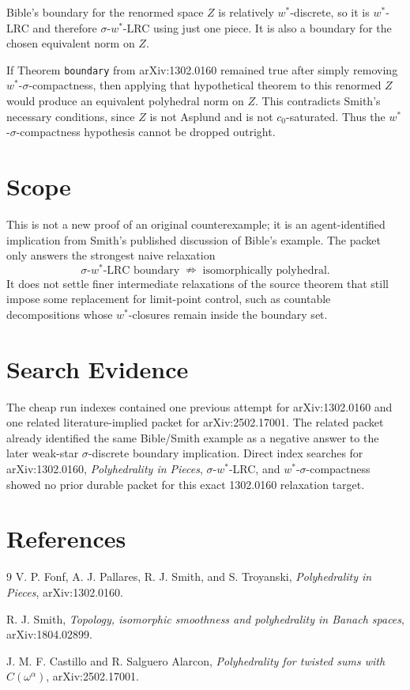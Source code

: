 \documentclass[11pt]{article}
\begin{document}
Bible's boundary for the renormed space $Z$ is relatively $w^*$-discrete, so
it is $w^*$-LRC and therefore $\sigma$-$w^*$-LRC using just one piece.  It is
also a boundary for the chosen equivalent norm on $Z$.

If Theorem \texttt{boundary} from arXiv:1302.0160 remained true after simply
removing $w^*$-$\sigma$-compactness, then applying that hypothetical theorem
to this renormed $Z$ would produce an equivalent polyhedral norm on $Z$.
This contradicts Smith's necessary conditions, since $Z$ is not Asplund and
is not $c_0$-saturated.  Thus the $w^*$-$\sigma$-compactness hypothesis
cannot be dropped outright.

\section*{Scope}

This is not a new proof of an original counterexample; it is an
agent-identified implication from Smith's published discussion of Bible's
example.  The packet only answers the strongest naive relaxation
\[
  \sigma\text{-}w^*\text{-LRC boundary}
  \;\nRightarrow\;
  \text{isomorphically polyhedral}.
\]
It does not settle finer intermediate relaxations of the source theorem that
still impose some replacement for limit-point control, such as countable
decompositions whose $w^*$-closures remain inside the boundary set.

\section*{Search Evidence}

The cheap run indexes contained one previous attempt for arXiv:1302.0160 and
one related literature-implied packet for arXiv:2502.17001.  The related
packet already identified the same Bible/Smith example as a negative answer
to the later weak-star $\sigma$-discrete boundary implication.  Direct index
searches for arXiv:1302.0160, \emph{Polyhedrality in Pieces},
$\sigma$-$w^*$-LRC, and $w^*$-$\sigma$-compactness showed no prior durable
packet for this exact 1302.0160 relaxation target.

\section*{References}

\begin{thebibliography}{9}
V. P. Fonf, A. J. Pallares, R. J. Smith, and S. Troyanski,
\emph{Polyhedrality in Pieces}, arXiv:1302.0160.

R. J. Smith,
\emph{Topology, isomorphic smoothness and polyhedrality in Banach spaces},
arXiv:1804.02899.

J. M. F. Castillo and R. Salguero Alarcon,
\emph{Polyhedrality for twisted sums with $C(\omega^\alpha)$},
arXiv:2502.17001.
\end{thebibliography}
\end{document}
